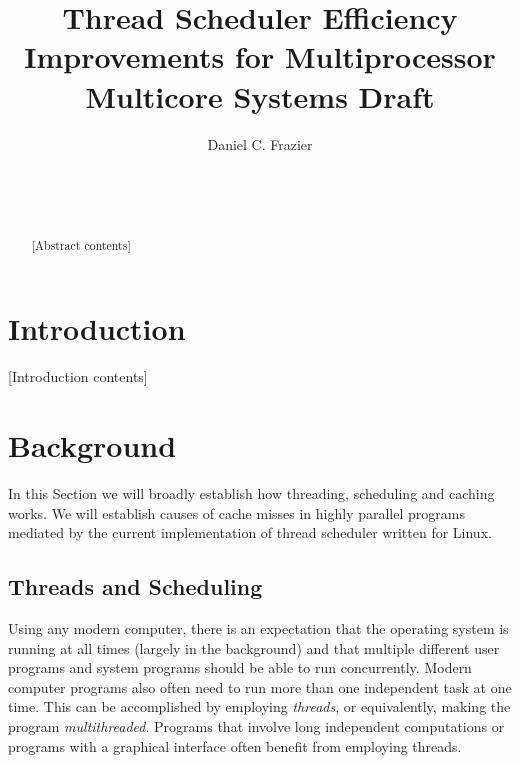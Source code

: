 \documentclass{sig-alternate}
\begin{document}

\title{Thread Scheduler Efficiency Improvements for Multiprocessor Multicore Systems Draft}


\author{
\alignauthor
Daniel C. Frazier\\
	\\
	\\
	\\
}
\maketitle


\begin{abstract}
[Abstract contents]
\end{abstract}


\section{Introduction}
\label{sec:intro}

[Introduction contents]

\section{Background}
\label{sec:bg}

In this Section we will broadly establish how threading, scheduling and caching works. We will establish causes of cache misses in highly parallel programs mediated by the current implementation of thread scheduler written for Linux.

\subsection{Threads and Scheduling}
\label{sec:threads}
Using any modern computer, there is an expectation that the operating system is running at all times (largely in the background) and that multiple different user programs and system programs should be able to run concurrently. Modern computer programs also often need to run more than one independent task at one time. This can be accomplished by employing \emph{threads}, or equivalently, making the program \emph{multithreaded}. Programs that involve long independent computations or programs with a graphical interface often benefit from employing threads.
\end{document}
